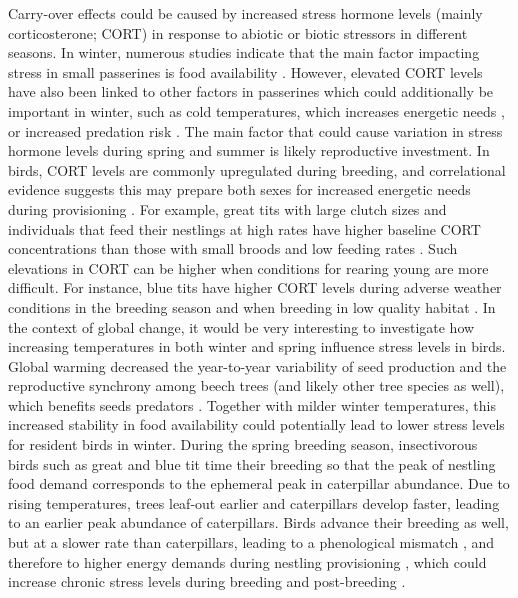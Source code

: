\documentclass[10pt, twoside]{book} %
\begin{document}
Carry-over effects could be caused by increased stress hormone levels (mainly corticosterone; CORT) in response to abiotic or biotic stressors in different seasons. In winter, numerous studies indicate that the main factor impacting stress in small passerines is food availability \citep{Jansson1981, Brittingham1988, Perdeck2000}. However, elevated CORT levels have also been linked to other factors in passerines which could additionally be important in winter, such as cold temperatures, which increases energetic needs \citep{Cirule2017}, or increased predation risk \citep{Scheuerlein2001, Clinchy2011}. The main factor that could cause variation in stress hormone levels during spring and summer is likely reproductive investment. In birds, CORT levels are commonly upregulated during breeding, and correlational evidence suggests this may prepare both sexes for increased energetic needs during provisioning \citep{Love2014, Ouyang2013a}. For example, great tits with large clutch sizes and individuals that feed their nestlings at high rates have higher baseline CORT concentrations than those with small broods and low feeding rates \citep{Ouyang2013}. Such elevations in CORT can be higher when conditions for rearing young are more difficult. For instance, blue tits have higher CORT levels during adverse weather conditions in the breeding season and when breeding in low quality habitat \citep{Henderson2017}. In the context of global change, it would be very interesting to investigate how increasing temperatures in both winter and spring influence stress levels in birds. Global warming decreased the year-to-year variability of seed production and the reproductive synchrony among beech trees (and likely other tree species as well), which benefits seeds predators \citep{Bogdziewicz2020}. Together with milder winter temperatures, this increased stability in food availability could potentially lead to lower stress levels for resident birds in winter. During the spring breeding season, insectivorous birds such as great and blue tit time their breeding so that the peak of nestling food demand corresponds to the ephemeral peak in caterpillar abundance. Due to rising temperatures, trees leaf-out earlier and caterpillars develop faster, leading to an earlier peak abundance of caterpillars. Birds advance their breeding as well, but at a slower rate than caterpillars, leading to a phenological mismatch \citep{Visser1998, Sanz2002}, and therefore to higher energy demands during nestling provisioning \citep{TeMarvelde2011}, which could increase chronic stress levels during breeding and post-breeding \citep{Henderson2017}. \\
\end{document}
